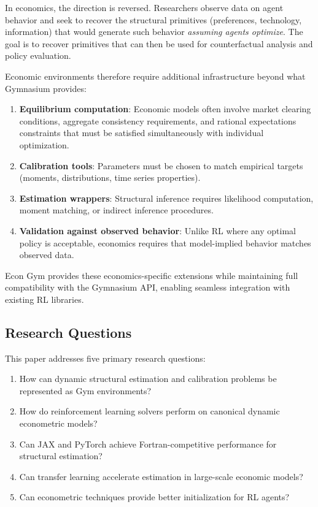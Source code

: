 \documentclass[12pt]{article}
\begin{document}
In economics, the direction is reversed. Researchers observe data on agent behavior and seek to recover the structural primitives (preferences, technology, information) that would generate such behavior \textit{assuming agents optimize}. The goal is to recover primitives that can then be used for counterfactual analysis and policy evaluation.

Economic environments therefore require additional infrastructure beyond what Gymnasium provides:
\begin{enumerate}
    \item \textbf{Equilibrium computation}: Economic models often involve market clearing conditions, aggregate consistency requirements, and rational expectations constraints that must be satisfied simultaneously with individual optimization.
    \item \textbf{Calibration tools}: Parameters must be chosen to match empirical targets (moments, distributions, time series properties).
    \item \textbf{Estimation wrappers}: Structural inference requires likelihood computation, moment matching, or indirect inference procedures.
    \item \textbf{Validation against observed behavior}: Unlike RL where any optimal policy is acceptable, economics requires that model-implied behavior matches observed data.
\end{enumerate}

Econ Gym provides these economics-specific extensions while maintaining full compatibility with the Gymnasium API, enabling seamless integration with existing RL libraries.

\subsection{Research Questions}

This paper addresses five primary research questions:
\begin{enumerate}
    \item How can dynamic structural estimation and calibration problems be represented as Gym environments?
    \item How do reinforcement learning solvers perform on canonical dynamic econometric models?
    \item Can JAX and PyTorch achieve Fortran-competitive performance for structural estimation?
    \item Can transfer learning accelerate estimation in large-scale economic models?
    \item Can econometric techniques provide better initialization for RL agents?
\end{enumerate}
\end{document}
